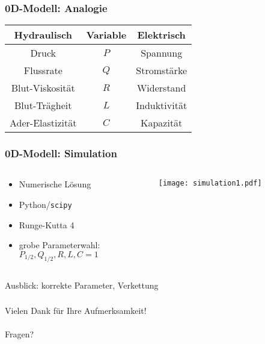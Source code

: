 \begin{frame}
\frametitle{0D-Modell: Analogie}
  \begin{center}
  	\begin{tabular}[!htb]{c c c}
  		Hydraulisch	&	Variable	&	Elektrisch\\
  		\hline
  		Druck	&	$P$	&	Spannung\\
  		Flussrate	&	$Q$	&	Stromstärke\\
  		Blut-Viskosität	&	$R$	&	Widerstand\\
  		Blut-Trägheit	&	$L$	&	Induktivität\\
  		Ader-Elastizität	&	$C$	&	Kapazität
  	\end{tabular}
  \end{center}

\end{frame}


\begin{frame}
\frametitle{0D-Modell: Simulation}
\begin{columns}
  \begin{column}{0.45\textwidth}
    \begin{itemize}
      \item Numerische Lösung\\
      \item Python/\texttt{scipy}\\
      \item Runge-Kutta 4\\
      \item grobe Parameterwahl:\\
      {$P_{1/2}, Q_{1/2}, R, L, C = 1$}
    \end{itemize}
  \end{column}
  \begin{column}{0.55\textwidth}
    \begin{center}
      \centering
      \texttt{[image: simulation1.pdf]}\\
    \end{center}
  \end{column}
\end{columns}
\pause
Ausblick: korrekte Parameter, Verkettung
\end{frame}

\begin{frame}\frametitle{}
  \begin{center}
    \begin{Large}
      Vielen Dank für Ihre Aufmerksamkeit!\\~\\
      Fragen?
    \end{Large}
  \end{center}
\end{frame}
